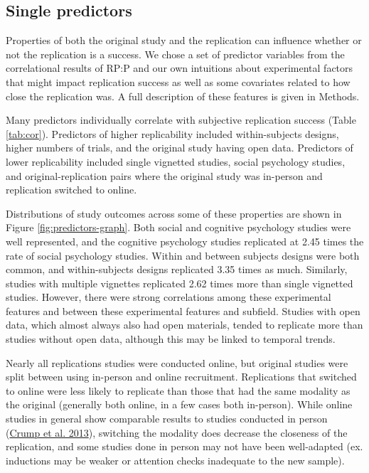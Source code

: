 \documentclass[
  english,
  a4paper,
]{article}
\begin{document}
\hypertarget{single-predictors}{%
\subsection{Single predictors}\label{single-predictors}}

Properties of both the original study and the replication can influence whether or not the replication is a success. We chose a set of predictor variables from the correlational results of RP:P and our own intuitions about experimental factors that might impact replication success as well as some covariates related to how close the replication was. A full description of these features is given in Methods.

Many predictors individually correlate with subjective replication success (Table \ref{tab:cor}). Predictors of higher replicability included within-subjects designs, higher numbers of trials, and the original study having open data. Predictors of lower replicability included single vignetted studies, social psychology studies, and original-replication pairs where the original study was in-person and replication switched to online.

Distributions of study outcomes across some of these properties are shown in Figure \ref{fig:predictors-graph}. Both social and cognitive psychology studies were well represented, and the cognitive psychology studies replicated at 2.45 times the rate of social psychology studies. Within and between subjects designs were both common, and within-subjects designs replicated 3.35 times as much. Similarly, studies with multiple vignettes replicated 2.62 times more than single vignetted studies. However, there were strong correlations among these experimental features and between these experimental features and subfield. Studies with open data, which almost always also had open materials, tended to replicate more than studies without open data, although this may be linked to temporal trends.

Nearly all replications studies were conducted online, but original studies were split between using in-person and online recruitment. Replications that switched to online were less likely to replicate than those that had the same modality as the original (generally both online, in a few cases both in-person). While online studies in general show comparable results to studies conducted in person (\protect\hyperlink{ref-crump2013}{Crump et al. 2013}), switching the modality does decrease the closeness of the replication, and some studies done in person may not have been well-adapted (ex. inductions may be weaker or attention checks inadequate to the new sample).
\end{document}
